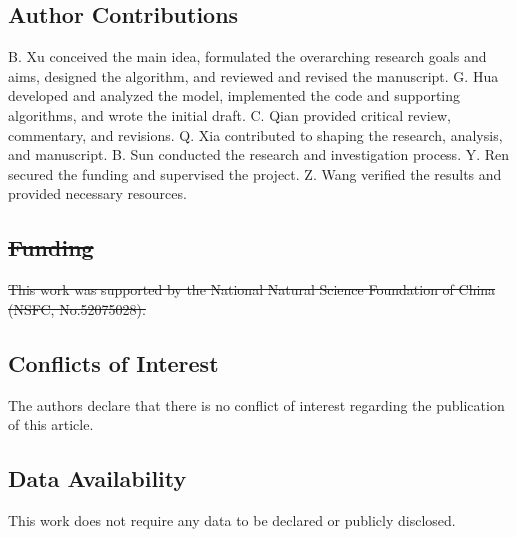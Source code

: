 \documentclass{article}
\providecommand{\DIFdel}[1]{{\protect\color{red}\sout{#1}}}                      %
\providecommand{\DIFdelbegin}{} %
\providecommand{\DIFdelend}{} %
\newcommand{\DIFscaledelfig}{0.5}
\newlength{\DIFdelgraphicswidth} %
\newlength{\DIFdelgraphicsheight} %
\newcommand{\DIFdelincludegraphics}[2][]{%
\sbox{\DIFdelgraphicsbox}{\DIFOincludegraphics[#1]{#2}}%
\settoboxwidth{\DIFdelgraphicswidth}{\DIFdelgraphicsbox} %
\settoboxtotalheight{\DIFdelgraphicsheight}{\DIFdelgraphicsbox} %
\scalebox{\DIFscaledelfig}{%
\parbox[b]{\DIFdelgraphicswidth}{\usebox{\DIFdelgraphicsbox}\\[-\baselineskip] \rule{\DIFdelgraphicswidth}{0em}}\llap{\resizebox{\DIFdelgraphicswidth}{\DIFdelgraphicsheight}{%
\setlength{\unitlength}{\DIFdelgraphicswidth}%
\begin{picture}(1,1)%
\thicklines\linethickness{2pt} %
{\color[rgb]{1,0,0}\put(0,0){\framebox(1,1){}}}%
{\color[rgb]{1,0,0}\put(0,0){\line( 1,1){1}}}%
{\color[rgb]{1,0,0}\put(0,1){\line(1,-1){1}}}%
\end{picture}%
}\hspace*{3pt}}} %
} %
\DeclareRobustCommand{\DIFdelbegin}{\DIFOdelbegin \let\includegraphics\DIFdelincludegraphics} %
\DeclareRobustCommand{\DIFdelend}{\DIFOaddend \let\includegraphics\DIFOincludegraphics} %
\begin{document}
\subsection*{Author Contributions} 

B. Xu conceived the main idea, formulated the overarching research goals and aims, designed the algorithm, and reviewed and revised the manuscript.
G. Hua developed and analyzed the model, implemented the code and supporting algorithms, and wrote the initial draft.
C. Qian provided critical review, commentary, and revisions.
Q. Xia contributed to shaping the research, analysis, and manuscript.
B. Sun conducted the research and investigation process.
Y. Ren secured the funding and supervised the project.
Z. Wang verified the results and provided necessary resources.

\DIFdelbegin \subsection*{\DIFdel{Funding}}

\DIFdel{This work was supported by the National Natural Science Foundation of China (NSFC, No.52075028).
}\DIFdelend %

\subsection*{Conflicts of Interest}

The authors declare that there is no conflict of interest regarding the publication of this article.

\subsection*{Data Availability}

This work does not require any data to be declared or publicly disclosed.



\end{document}
